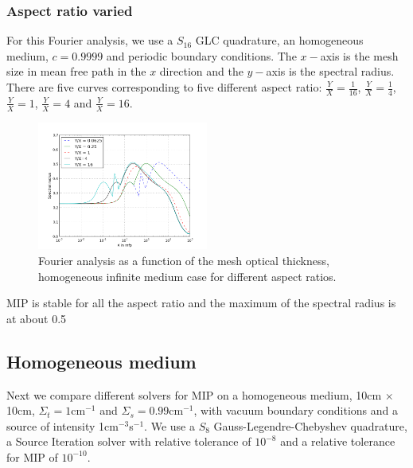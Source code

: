 \subsubsection{Aspect ratio varied}
For this Fourier analysis, we use a $S_{16}$ GLC quadrature, an homogeneous
medium, $c=0.9999$ and periodic boundary conditions. The $x-$axis is the mesh
size in mean free path in the $x$ direction and the $y-$axis is the spectral
radius. There are five curves corresponding to five different aspect ratio:
$\frac{Y}{X}=\frac{1}{16}$, $\frac{Y}{X}=\frac{1}{4}$, $\frac{Y}{X}=1$,
$\frac{Y}{X}=4$ and $\frac{Y}{X}=16$. 
\begin{figure}[H]
\centering
\includegraphics[width=0.5\textwidth]{aspect_ratio_9999}
\caption{Fourier analysis as a function of the mesh optical thickness,
homogeneous infinite medium case for different aspect ratios.}
\end{figure}
MIP is stable for all the aspect ratio and the maximum of the spectral radius
is at about 0.5

\subsection{Homogeneous medium}
Next we compare different solvers for MIP on a homogeneous medium, 10cm $\times$
10cm, $\Sigma_t=1$cm$^{-1}$ and $\Sigma_s=0.99$cm$^{-1}$, with vacuum boundary 
conditions and a source of intensity 1cm$^{-3}$s$^{-1}$. We use a $S_8$
Gauss-Legendre-Chebyshev quadrature, a Source Iteration solver with relative
tolerance of $10^{-8}$ and a relative tolerance for MIP of $10^{-10}$.
